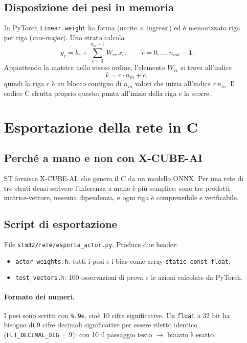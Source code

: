 \documentclass[11pt,a4paper]{article}
\newcommand{\code}[1]{\texttt{\small #1}}
\begin{document}
\subsection{Disposizione dei pesi in memoria}
In PyTorch \code{Linear.weight} ha forma (uscite $\times$ ingressi) ed è memorizzato riga per riga
(\emph{row-major}). Uno strato calcola
\begin{equation}
y_r = b_r + \sum_{c=0}^{n_{in}-1} W_{rc}\,x_c ,\qquad r = 0,\dots,n_{out}-1 .
\end{equation}
Appiattendo la matrice nello stesso ordine, l'elemento $W_{rc}$ si trova all'indice
\begin{equation}
k = r\cdot n_{in} + c ,
\end{equation}
quindi la riga $r$ è un blocco contiguo di $n_{in}$ valori che inizia all'indice $r\,n_{in}$.
Il codice C sfrutta proprio questo: punta all'inizio della riga e la scorre.

\section{Esportazione della rete in C}

\subsection{Perché a mano e non con X-CUBE-AI}
ST fornisce X-CUBE-AI, che genera il C da un modello ONNX. Per una rete di tre strati densi scrivere
l'inferenza a mano è più semplice: sono tre prodotti matrice-vettore, nessuna dipendenza, e ogni riga
è comprensibile e verificabile.

\subsection{Script di esportazione}
File \code{stm32/rete/esporta\_actor.py}. Produce due header:
\begin{itemize}
\item \code{actor\_weights.h}: tutti i pesi e i bias come array \code{static const float};
\item \code{test\_vectors.h}: 100 osservazioni di prova e le azioni calcolate da PyTorch.
\end{itemize}


\paragraph{Formato dei numeri.} I pesi sono scritti con \code{\%.9e}, cioè 10 cifre significative.
Un \code{float} a 32 bit ha bisogno di 9 cifre decimali significative per essere riletto identico
(\code{FLT\_DECIMAL\_DIG} = 9): con 10 il passaggio testo $\to$ binario è esatto.
\end{document}
